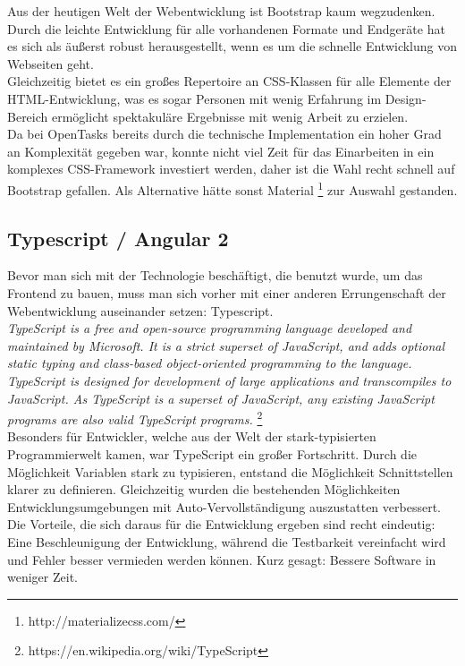 Aus der heutigen Welt der Webentwicklung ist Bootstrap kaum wegzudenken. Durch die leichte Entwicklung für alle vorhandenen Formate und Endgeräte hat es sich als äußerst robust herausgestellt, wenn es um die schnelle Entwicklung von Webseiten geht. \\
Gleichzeitig bietet es ein großes Repertoire an CSS-Klassen für alle Elemente der HTML-Entwicklung, was es sogar Personen mit wenig Erfahrung im Design-Bereich ermöglicht spektakuläre Ergebnisse mit wenig Arbeit zu erzielen. \\

Da bei OpenTasks bereits durch die technische Implementation ein hoher Grad an Komplexität gegeben war, konnte nicht viel Zeit für das Einarbeiten in ein komplexes CSS-Framework investiert werden, daher ist die Wahl recht schnell auf Bootstrap gefallen. Als Alternative hätte sonst Material \footnote{http://materializecss.com/} zur Auswahl gestanden. \\



\subsection{Typescript / Angular 2} \label{TS_NG2}

Bevor man sich mit der Technologie beschäftigt, die benutzt wurde, um das Frontend zu bauen, muss man sich vorher mit einer anderen Errungenschaft der Webentwicklung auseinander setzen: Typescript. \\

\emph{\glqq   
TypeScript is a free and open-source programming language developed and maintained by Microsoft. It is a strict superset of JavaScript, and adds optional static typing and class-based object-oriented programming to the language. \\
TypeScript is designed for development of large applications and transcompiles to JavaScript. As TypeScript is a superset of JavaScript, any existing JavaScript programs are also valid TypeScript programs.
\grqq} \footnote{https://en.wikipedia.org/wiki/TypeScript} \\

Besonders für Entwickler, welche aus der Welt der stark-typisierten Programmierwelt kamen, war TypeScript ein großer Fortschritt. Durch die Möglichkeit Variablen stark zu typisieren, entstand die Möglichkeit Schnittstellen klarer zu definieren. Gleichzeitig wurden die bestehenden Möglichkeiten Entwicklungsumgebungen mit Auto-Vervollständigung auszustatten verbessert. \\
Die Vorteile, die sich daraus für die Entwicklung ergeben sind recht eindeutig: Eine Beschleunigung der Entwicklung, während die Testbarkeit vereinfacht wird und Fehler besser vermieden werden können. Kurz gesagt: Bessere Software in weniger Zeit. \\

